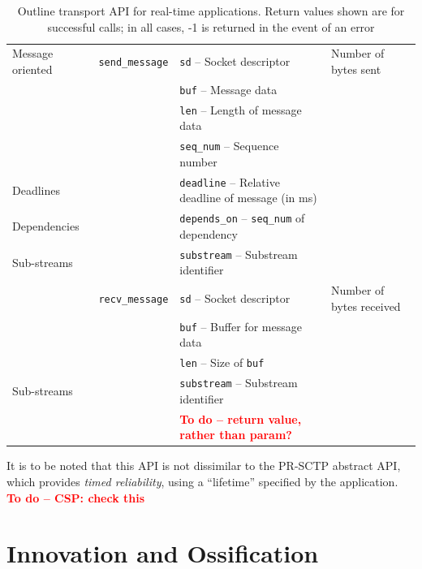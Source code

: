 \documentclass[10pt]{sig-alternate-05-2015}
\newcommand{\todo}[1]{\textbf{\textcolor{red}{To do -- #1}}}
\begin{document}
\begin{table}
\begin{tabularx}{\textwidth}{llll}
    \midrule
      Message oriented             & \texttt{send\_message}
                                              & \texttt{sd} -- Socket descriptor               & Number of bytes sent \\
                                   &          & \texttt{buf} -- Message data & \\
                                   &          & \texttt{len} -- Length of message data & \\
                                   &          & \texttt{seq\_num} -- Sequence number & \\
      Deadlines                    &          & \texttt{deadline} -- Relative deadline of message (in ms) & \\
      Dependencies                 &          & \texttt{depends\_on} -- \texttt{seq\_num} of dependency & \\
      Sub-streams                  &          & \texttt{substream} -- Substream identifier & \\
                                   & \texttt{recv\_message}
                                              & \texttt{sd} -- Socket descriptor               & Number of bytes received \\
                                   &          & \texttt{buf} -- Buffer for message data & \\
                                   &          & \texttt{len} -- Size of \texttt{buf} & \\
      Sub-streams                  &          & \texttt{substream} -- Substream identifier & \\
                                   &          & \todo{return value, rather than param?} & \\
    \bottomrule
  \end{tabularx}
  \caption{Outline transport API for real-time applications. Return values
  shown are for successful calls; in all cases, -1 is returned in the event
  of an error}
  \label{tab:api}
\end{table}

It is to be noted that this API is not dissimilar to the PR-SCTP abstract
API, which provides \textit{timed reliability}, using a ``lifetime''
specified by the application. \todo{CSP: check this}

\section{Innovation and Ossification}
\label{sec:ossification}
\end{document}

